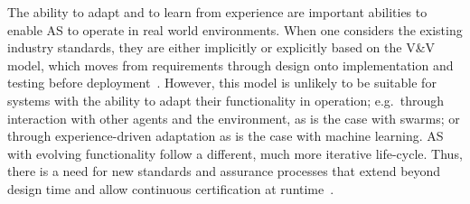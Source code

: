 \documentclass[sigconf,nonacm]{acmart}%
\begin{document}
	The ability to adapt and to learn from experience are important abilities to enable AS to operate in real world environments. When one considers the existing industry standards, they are either implicitly or explicitly based on the V\&V model, which moves from requirements through design onto implementation and testing before deployment~\cite{Jia2021}. 
	However, this model is unlikely to be suitable for systems with the ability to adapt their functionality in operation; e.g.\ through interaction with other agents and the environment, as is the case with swarms; or through experience-driven adaptation as is the case with machine learning. AS with evolving functionality follow a different, much more iterative life-cycle. 
	Thus, there is a need for new standards and assurance processes that extend beyond design time and allow continuous certification at runtime~\cite{rushby:2008}.
\end{document}
